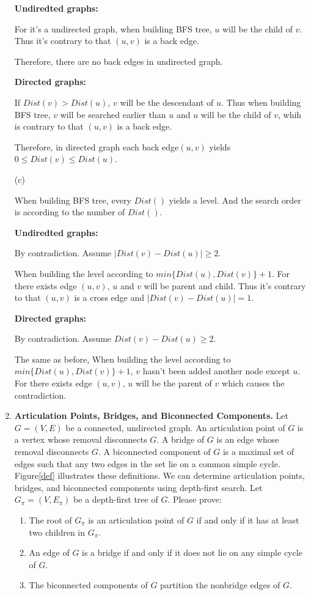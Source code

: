 \documentclass[12pt,a4paper]{article}
\theoremstyle{definition}
\begin{document}
\begin{enumerate}
	\textbf{Undiredted graphs:}

	For it's a undirected graph, when building BFS tree, $u$ will be the child of $v$. Thus it's contrary to that $(u,v)$ is a back edge.

	Therefore, there  are  no  back  edges  in  undirected  graph.

	\textbf{Directed graphs:}

	If $Dist(v)> Dist(u)$, $v$ will be the descendant of $u$. Thus when building BFS tree, $v$ will be searched earlier than $u$ and $u$ will be the child of $v$, whih is contrary to that $(u,v)$ is a back edge.
	
	Therefore, in  directed  graph  each  back  edge$(u, v)$ yields $ 0\le Dist(v)\le Dist(u)$.

	(c)

	When building BFS tree, every $Dist()$ yields a level. And the search order is according to  the number of $Dist()$.

	\textbf{Undiredted graphs:}

	By contradiction. Assume $|Dist(v)-Dist(u)|\ge 2$.
	
	When building the level according to $min\{ Dist(u),Dist(v)\}+1$. For there exists edge $(u,v)$, $u$ and $v$ will be parent and child. Thus it's contrary to that $(u,v)$ is a cross edge and $|Dist(v)-Dist(u)|=1$.
	
	\textbf{Directed graphs:}

	By contradiction. Assume $Dist(v)-Dist(u)\ge 2$.

	The same as before, When building the level according to $min\{ Dist(u),Dist(v)\}+1$, $v$ hasn't been added another node except $u$. For there exists edge $(u,v)$, $u$ will be the parent of $v$ which causes the contradiction.


	\item 
    \textbf{Articulation Points, Bridges, and Biconnected Components.} Let $G=(V, E)$ be a connected, undirected graph. An articulation point of $G$ is a vertex whose removal disconnects $G$. A bridge of $G$ is an edge whose removal disconnects $G .$ A biconnected component of $G$ is a maximal set of edges such that any two edges in the set lie on a common simple cycle. Figure\ref{def} illustrates these definitions. We can determine articulation points, bridges, and biconnected components using depth-first search. Let $G_{\pi}=\left(V, E_{\pi}\right)$ be a depth-first tree of $G$. Please prove:
    
    \begin{enumerate}
    	\item The root of $G_{\pi}$ is an articulation point of $G$ if and only if it has at least two children in $G_{\pi}$.
    	\item An edge of $G$ is a bridge if and only if it does not lie on any simple cycle of $G$.
    	\item The biconnected components of $G$ partition the nonbridge edges of $G$.
    \end{enumerate}


\end{enumerate}
\end{document}
